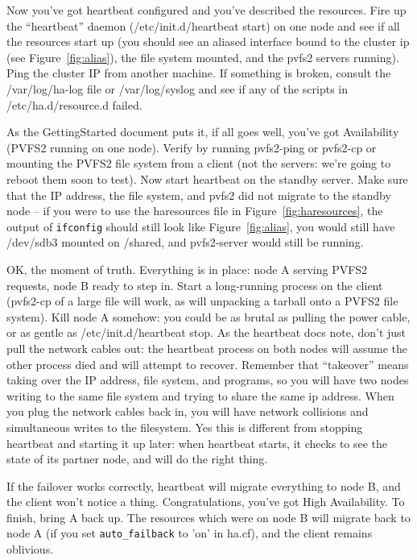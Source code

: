 \documentclass[11pt]{article}
\begin{document}
Now you've got heartbeat configured and you've described the resources.
Fire up the ``heartbeat'' daemon (/etc/init.d/heartbeat start) on one
node and see if all the resources start up (you should see an aliased
interface bound to the cluster ip (see Figure~\ref{fig:alias}), the file system mounted, and the
pvfs2 servers running).
Ping the cluster IP from another machine.  If something is broken,
consult the /var/log/ha-log file or /var/log/syslog and see if any of
the scripts in /etc/ha.d/resource.d failed.

As the GettingStarted document puts it, if all goes well, you've got
Availability (PVFS2 running on one node).  Verify by running pvfs2-ping
or pvfs2-cp or mounting the PVFS2 file system from a client (not the
servers: we're going to reboot them soon to test).  Now start heartbeat
on the standby server.  Make sure that the IP address, the file system,
and pvfs2 did not migrate to the standby node --  if you were to use the
haresources file in Figure~\ref{fig:haresources}, the output of
\texttt{ifconfig} should still look like Figure~\ref{fig:alias}, you
would still have /dev/sdb3 mounted on /shared, and pvfs2-server would
still be running. 

OK, the moment of truth.  Everything is in place: node A serving PVFS2
requests, node B ready to step in.  Start a long-running process on the
client (pvfs2-cp of a large file will work, as will unpacking a tarball
onto a PVFS2 file system).  Kill node A somehow:  you could be as brutal
as pulling the power cable, or as gentle as /etc/init.d/heartbeat stop.
As the heartbeat docs note, don't just pull the network cables out: the
heartbeat process on both nodes will assume the other process died and
will attempt to recover.  Remember that ``takeover'' means taking over
the IP address, file system, and programs, so you will have two nodes
writing to the same file system and trying to share the same ip address.
When you plug the network cables back in, you will have network
collisions and simultaneous writes to the filesystem.  Yes this is
different from stopping heartbeat and starting it up later: when
heartbeat starts, it checks to see the state of its partner node, and
will do the right thing. 

If the failover works correctly, heartbeat will migrate everything to
node B, and the client won't notice a thing.   Congratulations, you've
got High Availability.  To finish, bring A back up.  The resources which
were on node B will migrate back to node A (if you set
\texttt{auto\_failback} to 'on' in ha.cf), and the client remains
oblivious.
\end{document}
